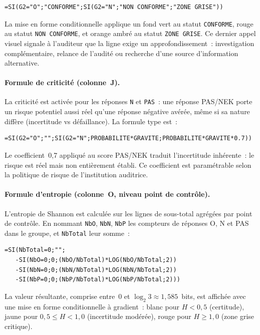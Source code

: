 \begin{verbatim}
=SI(G2="O";"CONFORME";SI(G2="N";"NON CONFORME";"ZONE GRISE"))
\end{verbatim}

La mise en forme conditionnelle applique un fond vert au statut
\texttt{CONFORME}, rouge au statut \texttt{NON~CONFORME}, et orange ambré au
statut \texttt{ZONE~GRISE}. Ce dernier appel visuel signale à l'auditeur que la
ligne exige un approfondissement~: investigation complémentaire, relance de
l'audité ou recherche d'une source d'information alternative.

\paragraph{Formule de criticité (colonne~J).}
La criticité est activée pour les réponses \texttt{N} et \texttt{PAS}~: une
réponse PAS/NEK porte un risque potentiel aussi réel qu'une réponse négative
avérée, même si sa nature diffère (incertitude vs défaillance). La formule
type est~:

\begin{verbatim}
=SI(G2="O";"";SI(G2="N";PROBABILITE*GRAVITE;PROBABILITE*GRAVITE*0.7))
\end{verbatim}

Le coefficient~0,7 appliqué au score PAS/NEK traduit l'incertitude
inhérente~: le risque est réel mais non entièrement établi. Ce coefficient est
paramétrable selon la politique de risque de l'institution auditrice.

\paragraph{Formule d'entropie (colonne~O, niveau point de contrôle).}
L'entropie de Shannon est calculée sur les lignes de sous-total agrégées par
point de contrôle. En nommant \texttt{NbO}, \texttt{NbN}, \texttt{NbP} les
compteurs de réponses O, N et PAS dans le groupe, et \texttt{NbTotal} leur
somme~:

\begin{verbatim}
=SI(NbTotal=0;"";
   -SI(NbO=0;0;(NbO/NbTotal)*LOG(NbO/NbTotal;2))
   -SI(NbN=0;0;(NbN/NbTotal)*LOG(NbN/NbTotal;2))
   -SI(NbP=0;0;(NbP/NbTotal)*LOG(NbP/NbTotal;2)))
\end{verbatim}

La valeur résultante, comprise entre~0 et $\log_2 3 \approx 1{,}585$~bits,
est affichée avec une mise en forme conditionnelle à gradient~: blanc pour
$H < 0{,}5$ (certitude), jaune pour $0{,}5 \leq H < 1{,}0$ (incertitude
modérée), rouge pour $H \geq 1{,}0$ (zone grise critique).

